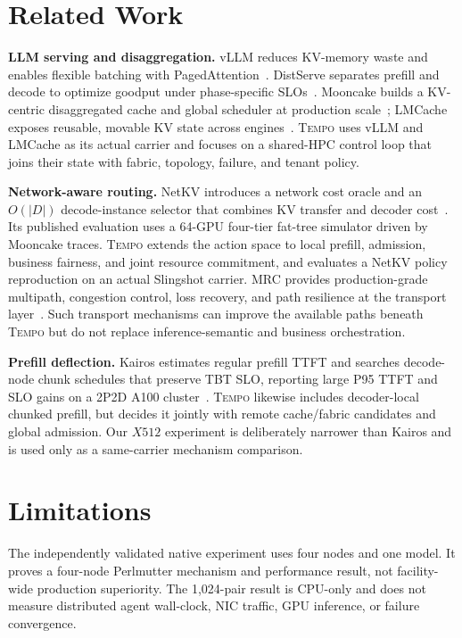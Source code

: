 \documentclass[10pt,twocolumn]{article}
\newcommand{\system}{\textsc{Tempo}\xspace}
\newcommand{\tightparagraph}[1]{\vspace{0.25em}\noindent\textbf{#1.}}
\begin{document}
\section{Related Work}

\tightparagraph{LLM serving and disaggregation}
vLLM reduces KV-memory waste and enables flexible batching with
PagedAttention~\cite{vllm}.  DistServe separates prefill and decode to optimize
goodput under phase-specific SLOs~\cite{distserve}.  Mooncake builds a
KV-centric disaggregated cache and global scheduler at production
scale~\cite{mooncake}; LMCache exposes reusable, movable KV state across
engines~\cite{lmcache}.  \system uses vLLM and LMCache as its actual carrier and
focuses on a shared-HPC control loop that joins their state with fabric,
topology, failure, and tenant policy.

\tightparagraph{Network-aware routing}
NetKV introduces a network cost oracle and an $O(|D|)$ decode-instance selector
that combines KV transfer and decoder cost~\cite{netkv}.  Its published
evaluation uses a 64-GPU four-tier fat-tree simulator driven by Mooncake traces.
\system extends the action space to local prefill, admission, business
fairness, and joint resource commitment, and evaluates a NetKV policy
reproduction on an actual Slingshot carrier.  MRC provides production-grade
multipath, congestion control, loss recovery, and path resilience at the
transport layer~\cite{mrc}.  Such transport mechanisms can improve the
available paths beneath \system but do not replace inference-semantic and
business orchestration.

\tightparagraph{Prefill deflection}
Kairos estimates regular prefill TTFT and searches decode-node chunk schedules
that preserve TBT SLO, reporting large P95 TTFT and SLO gains on a 2P2D A100
cluster~\cite{kairos}.  \system likewise includes decoder-local chunked
prefill, but decides it jointly with remote cache/fabric candidates and global
admission.  Our $X512$ experiment is deliberately narrower than Kairos and is
used only as a same-carrier mechanism comparison.

\section{Limitations}

The independently validated native experiment uses four nodes and one model.
It proves a four-node Perlmutter mechanism and performance result, not
facility-wide production superiority.  The 1,024-pair result is CPU-only and
does not measure distributed agent wall-clock, NIC traffic, GPU inference, or
failure convergence.
\end{document}
